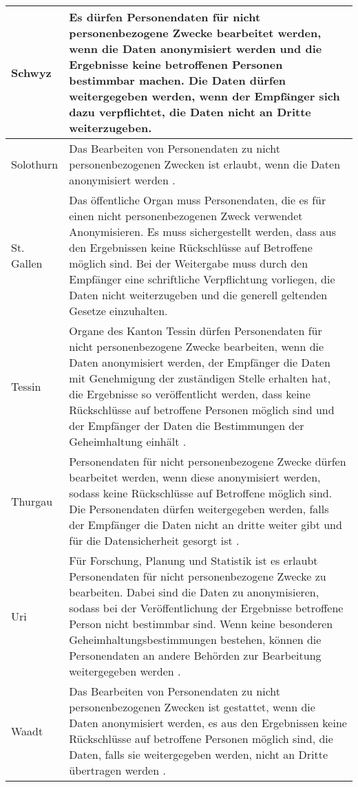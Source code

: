 \begin{longtable}{| p{} | p{}|}
		\hline
    Schwyz & Es dürfen Personendaten für nicht personenbezogene Zwecke bearbeitet werden, wenn die Daten anonymisiert werden und die Ergebnisse keine betroffenen Personen bestimmbar machen. Die Daten dürfen weitergegeben werden, wenn der Empfänger sich dazu verpflichtet, die Daten nicht an Dritte weiterzugeben. \parencite[§§ 14 Abs 1-2]{DSSGSZ} \\

		\hline
		Solothurn & Das Bearbeiten von Personendaten zu nicht personenbezogenen Zwecken ist erlaubt, wenn die Daten anonymisiert werden \parencite[§§ 16 Abs 3]{DSSGSO}. \\
    \hline
		St. Gallen & Das öffentliche Organ muss Personendaten, die es für einen nicht personenbezogenen Zweck verwendet Anonymisieren. Es muss sichergestellt werden, dass aus den Ergebnissen keine Rückschlüsse auf Betroffene möglich sind. Bei der Weitergabe muss durch den Empfänger eine schriftliche Verpflichtung vorliegen, die Daten nicht weiterzugeben und die generell geltenden Gesetze einzuhalten\parencite[§§ 7 Abs 1-3]{DSSGSG}. \\
		\hline
		Tessin & Organe des Kanton Tessin dürfen Personendaten für nicht personenbezogene Zwecke bearbeiten, wenn die Daten anonymisiert werden, der Empfänger die Daten mit Genehmigung der zuständigen Stelle erhalten hat, die Ergebnisse so veröffentlicht werden, dass keine Rückschlüsse auf betroffene Personen möglich sind und der Empfänger der Daten die Bestimmungen der Geheimhaltung einhält \parencite[§§ 15 Abs 1-2]{DSSGTI}. \\
		\hline
		Thurgau & Personendaten für nicht personenbezogene Zwecke dürfen bearbeitet werden, wenn diese anonymisiert werden, sodass keine Rückschlüsse auf Betroffene möglich sind. Die Personendaten dürfen  weitergegeben werden, falls der Empfänger die Daten nicht an dritte weiter gibt und für die Datensicherheit gesorgt ist \parencite[§§ 11 Abs 1-3]{DSSGTG}. \\
		\hline
		Uri & Für Forschung, Planung und Statistik ist es erlaubt Personendaten für nicht personenbezogene Zwecke zu bearbeiten. Dabei sind die Daten zu anonymisieren, sodass bei der Veröffentlichung der Ergebnisse betroffene Person nicht bestimmbar sind. Wenn keine besonderen Geheimhaltungsbestimmungen bestehen, können die Personendaten an andere Behörden zur Bearbeitung weitergegeben werden \parencite[§§ 10 Abs. 1-2]{DSSGUR}. \\
		\hline
    Waadt & Das Bearbeiten von Personendaten zu nicht personenbezogenen Zwecken ist gestattet, wenn die Daten anonymisiert werden, es aus den Ergebnissen keine Rückschlüsse auf betroffene Personen möglich sind, die Daten, falls sie weitergegeben werden, nicht an Dritte übertragen werden \parencite[§§ 24 Abs 1-3]{DSSGVD}. \\

\end{longtable}
